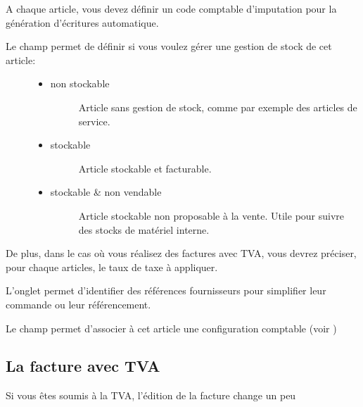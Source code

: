 \documentclass[a4paper,10pt,oneside,french]{sphinxmanual}
\begin{document}
A chaque article, vous devez définir un code comptable d’imputation pour la génération d’écritures automatique.
\begin{description}
\item[{Le champ  permet de définir si vous voulez gérer une gestion de stock de cet article:}] \leavevmode\begin{itemize}
\item {} \begin{description}
\item[{non stockable}] \leavevmode
Article sans gestion de stock, comme par exemple des articles de service.

\end{description}

\item {} \begin{description}
\item[{stockable}] \leavevmode
Article stockable et facturable.

\end{description}

\item {} \begin{description}
\item[{stockable \& non vendable}] \leavevmode
Article stockable non proposable à la vente.
Utile pour suivre des stocks de matériel interne.

\end{description}

\end{itemize}

\end{description}

De plus, dans le cas où vous réalisez des factures avec TVA, vous devrez préciser, pour chaque articles, le taux de taxe à appliquer.

L’onglet  permet d’identifier des références fournisseurs pour simplifier leur commande ou leur référencement.

Le champ  permet d’associer à cet article une configuration comptable (voir )


\subsection{La facture avec TVA}
\label{\detokenize{invoice/articles:la-facture-avec-tva}}
Si vous êtes soumis à la TVA, l’édition de la facture change un peu
\end{document}

